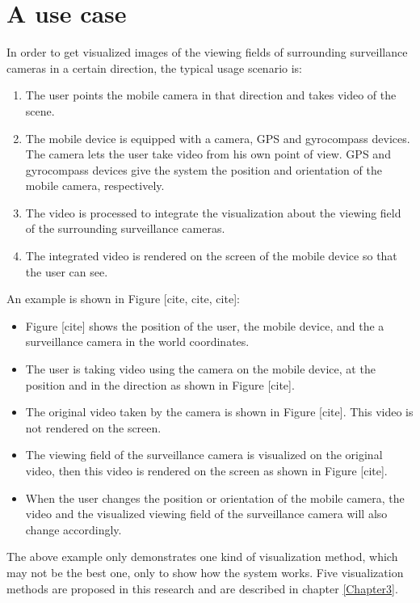 \section{A use case}

In order to get visualized images of the viewing fields of surrounding surveillance cameras in a certain direction, the typical usage scenario is:

\begin{enumerate}
\item The user points the mobile camera in that direction and takes video of the scene.
\item The mobile device is equipped with a camera, GPS and gyrocompass devices. The camera lets the user take video from his own point of view. GPS and gyrocompass devices give the system the position and orientation of the mobile camera, respectively.
\item The video is processed to integrate the visualization about the viewing field of the surrounding surveillance cameras.
\item The integrated video is rendered on the screen of the mobile device so that the user can see.
\end{enumerate}

An example is shown in Figure [cite, cite, cite]:
\begin{itemize}
\item Figure [cite] shows the position of the user, the mobile device, and the a surveillance camera in the world coordinates.
\item The user is taking video using the camera on the mobile device, at the position and in the direction as shown in Figure [cite].
\item The original video taken by the camera is shown in Figure [cite]. This video is not rendered on the screen.
\item The viewing field of the surveillance camera is visualized on the original video, then this video is rendered on the screen as shown in Figure [cite].
\item When the user changes the position or orientation of the mobile camera, the video and the visualized viewing field of the surveillance camera will also change accordingly.
\end{itemize}

The above example only demonstrates one kind of visualization method, which may not be the best one, only to show how the system works. Five visualization methods are proposed in this research and are described in chapter \ref{Chapter3}.
